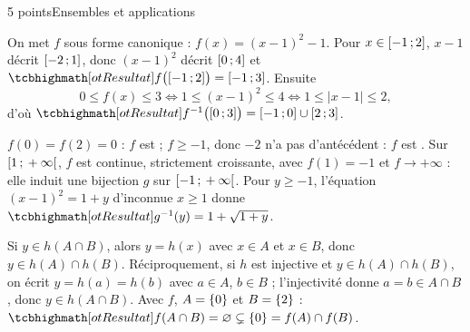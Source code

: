 

\begin{corrigeEval}{5 points}{Ensembles et applications}
\begin{questions}
  \item On met $f$ sous forme canonique : $f(x)=(x-1)^{2}-1$. Pour
    $x\in\mathopen{[}-1\,{;}\,2\mathclose{]}$, $x-1$ décrit $\mathopen{[}-2\,{;}\,1\mathclose{]}$, donc $(x-1)^{2}$ décrit
    $\mathopen{[}0\,{;}\,4\mathclose{]}$ et $\res{f\bigl(\intFF{-1}{2}\bigr)=\intFF{-1}{3}}$. Ensuite
    \[0\leqslant f(x)\leqslant3\iff1\leqslant(x-1)^{2}\leqslant4
      \iff1\leqslant|x-1|\leqslant2,\]
    d'où $\res{f^{-1}\bigl(\intFF{0}{3}\bigr)=\intFF{-1}{0}\cup\intFF{2}{3}}$.
  \item $f(0)=f(2)=0$ : $f$ est  ; $f\geqslant-1$,
    donc $-2$ n'a pas d'antécédent : $f$ est . Sur
    $\mathopen{[}1\,{;}\,+\infty\mathclose{[}$, $f$ est continue, strictement croissante, avec
    $f(1)=-1$ et $f\to+\infty$ : elle induit une bijection $g$ sur
    $\mathopen{[}-1\,{;}\,+\infty\mathclose{[}$. Pour $y\geqslant-1$, l'équation $(x-1)^{2}=1+y$
    d'inconnue $x\geqslant1$ donne $\res{g^{-1}(y)=1+\sqrt{1+y}}$.
  \item Si $y\in h(A\cap B)$, alors $y=h(x)$ avec $x\in A$ et $x\in B$, donc
    $y\in h(A)\cap h(B)$. Réciproquement, si $h$ est injective et
    $y\in h(A)\cap h(B)$, on écrit $y=h(a)=h(b)$ avec $a\in A$, $b\in B$ ;
    l'injectivité donne $a=b\in A\cap B$, donc $y\in h(A\cap B)$. Avec $f$,
    $A=\left\{0\right\}$ et $B=\left\{2\right\}$ :
    $\res{f(A\cap B)=\varnothing\subsetneq\ens{0}=f(A)\cap f(B)}$.
\end{questions}
\begin{center}\begin{minipage}{\linewidth}\centering
{}
\end{minipage}
\end{center}
\end{corrigeEval}
